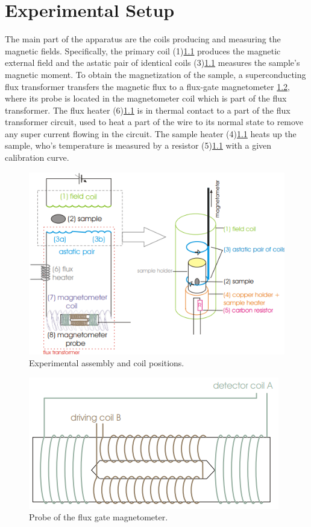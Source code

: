 \documentclass[openany,11pt,a4paper]{report}
\begin{document}
\chapter{Experimental Setup}

The main part of the apparatus are the coils producing and measuring the magnetic fields. Specifically, the primary coil (1)\ref{setup} produces the magnetic external field and the astatic pair of identical coils (3)\ref{setup} measures the sample's magnetic moment. To obtain the magnetization of the sample, a superconducting flux transformer transfers the magnetic flux to a flux-gate magnetometer \ref{fluxmag}, where its probe is located in the magnetometer coil which is part of the flux
transformer. The flux heater (6)\ref{setup} 
is in thermal contact to a part of the flux transformer circuit, used to heat a part
of the wire to its normal state to remove any super current flowing in the circuit. The sample heater (4)\ref{setup} heats up the sample, who's temperature is measured by a resistor (5)\ref{setup} with a given calibration curve.

\begin{figure}[H]
\centering
\includegraphics[scale=1.15]{experiment.PNG}   
\caption{ Experimental assembly and coil positions. \cite{script}}
\label{setup}
\end{figure}

\begin{figure}[H]
\centering
\includegraphics[scale=0.90]{Magnetometerprobe.PNG}    
\caption{Probe of the flux gate magnetometer.\cite{script}}
\label{fluxmag}
\end{figure}
\end{document}
